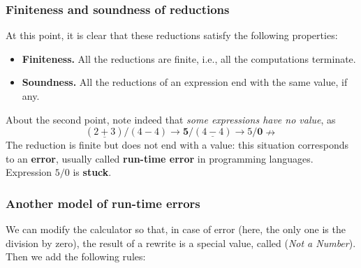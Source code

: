 %
\begin{frame}
\frametitle{Finiteness and soundness of reductions}

At this point, it is clear that these reductions satisfy the following
properties:
\begin{itemize}

  \item \textbf{Finiteness.} All the reductions are finite, i.e., all
    the computations terminate.

  \item \textbf{Soundness.} All the reductions of an expression end
    with the same value, if any.

\end{itemize}

About the second point, note indeed that \emph{some expressions have
  no value}, as
\[
(\underline{2+3})/(4-4) \rightarrow \textbf{5}/(\underline{4-4})
\rightarrow 5/\textbf{0} \nrightarrow
\]
The reduction is finite but does not end with a value: this situation
corresponds to an \textbf{error}, usually called \textbf{run-time
  error} in programming languages. Expression \(5/0\) is
\textbf{stuck}.

\end{frame}

%
\begin{frame}
\frametitle{Another model of run-time errors}

We can modify the calculator so that, in case of error (here, the only
one is the division by zero), the result of a rewrite is a special
value, called \NaN (\emph{Not a Number}). Then we add the following
rules:

\end{frame}

